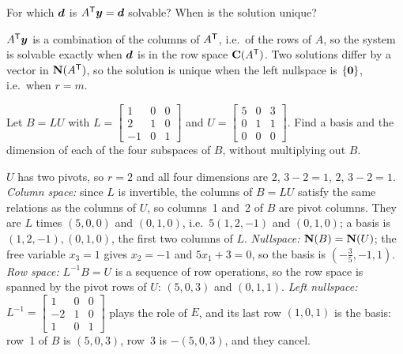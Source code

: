 \begin{exercise}\label{exr:u11-ATy}
For which $\boldsymbol{d}$ is $A^{\mathsf{T}}\boldsymbol{y}=\boldsymbol{d}$ solvable? When is the solution unique?
\end{exercise}
\begin{solution}
$A^{\mathsf{T}}\boldsymbol{y}$ is a combination of the columns of $A^{\mathsf{T}}$, i.e.\ of the rows of $A$, so the system is
solvable exactly when $\boldsymbol{d}$ is in the row space $\mathbf{C}(A^{\mathsf{T}})$. Two solutions differ by a vector in
$\mathbf{N}(A^{\mathsf{T}})$, so the solution is unique when the left nullspace is $\{\boldsymbol{0}\}$, i.e.\ when $r=m$.
\end{solution}

\begin{exercise}\label{exr:u11-LU}
Let $B=LU$ with $L=\begin{bmatrix}1&0&0\\2&1&0\\-1&0&1\end{bmatrix}$ and
$U=\begin{bmatrix}5&0&3\\0&1&1\\0&0&0\end{bmatrix}$. Find a basis and the dimension of each of the
four subspaces of $B$, without multiplying out $B$.
\end{exercise}
\begin{solution}
$U$ has two pivots, so $r=2$ and all four dimensions are $2$, $3-2=1$, $2$, $3-2=1$.
\emph{Column space:} since $L$ is invertible, the columns of $B=LU$ satisfy the same relations as
the columns of $U$, so columns~1 and~2 of $B$ are pivot columns. They are $L$ times $(5,0,0)$ and
$(0,1,0)$, i.e.\ $5(1,2,-1)$ and $(0,1,0)$; a basis is $(1,2,-1),(0,1,0)$, the first two columns
of $L$. \emph{Nullspace:} $\mathbf{N}(B)=\mathbf{N}(U)$; the free variable $x_3=1$ gives $x_2=-1$ and
$5x_1+3=0$, so the basis is $(-\tfrac35,-1,1)$. \emph{Row space:} $L^{-1}B=U$ is a sequence of row
operations, so the row space is spanned by the pivot rows of $U$: $(5,0,3)$ and $(0,1,1)$.
\emph{Left nullspace:} $L^{-1}=\begin{bmatrix}1&0&0\\-2&1&0\\1&0&1\end{bmatrix}$ plays the role of
$E$, and its last row $(1,0,1)$ is the basis: row~1 of $B$ is $(5,0,3)$, row~3 is $-(5,0,3)$, and
they cancel.
\end{solution}

